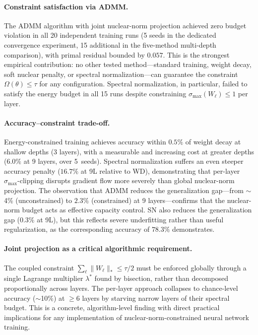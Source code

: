 \documentclass[a4paper,fleqn]{cas-sc}
\theoremstyle{remark}
\theoremstyle{definition}
\begin{document}
\paragraph{Constraint satisfaction via ADMM.}
The ADMM algorithm with joint nuclear-norm projection achieved zero budget violation in all 20 independent training runs (5 seeds in the dedicated convergence experiment, 15 additional in the five-method multi-depth comparison), with primal residual bounded by $0.057$. This is the strongest empirical contribution: no other tested method---standard training, weight decay, soft nuclear penalty, or spectral normalization---can guarantee the constraint $\Omega(\theta)\le\tau$ for any configuration. Spectral normalization, in particular, failed to satisfy the energy budget in all 15 runs despite constraining $\sigma_{\max}(W_\ell)\le 1$ per layer.

\paragraph{Accuracy--constraint trade-off.}
Energy-constrained training achieves accuracy within $0.5\%$ of weight decay at shallow depths (3 layers), with a measurable and increasing cost at greater depths ($6.0\%$ at 9 layers, over 5~seeds). Spectral normalization suffers an even steeper accuracy penalty ($16.7\%$ at 9L relative to WD), demonstrating that per-layer $\sigma_{\max}$-clipping disrupts gradient flow more severely than global nuclear-norm projection. The observation that ADMM reduces the generalization gap---from $\sim$4\% (unconstrained) to $2.3\%$ (constrained) at 9 layers---confirms that the nuclear-norm budget acts as effective capacity control. SN also reduces the generalization gap ($0.3\%$ at 9L), but this reflects severe underfitting rather than useful regularization, as the corresponding accuracy of $78.3\%$ demonstrates.

\paragraph{Joint projection as a critical algorithmic requirement.}
The coupled constraint $\sum_\ell\|W_\ell\|_*\le\tau/2$ must be enforced globally through a single Lagrange multiplier $\lambda^*$ found by bisection, rather than decomposed proportionally across layers. The per-layer approach collapses to chance-level accuracy ($\sim$10\%) at $\ge 6$ layers by starving narrow layers of their spectral budget. This is a concrete, algorithm-level finding with direct practical implications for any implementation of nuclear-norm-constrained neural network training.
\end{document}
